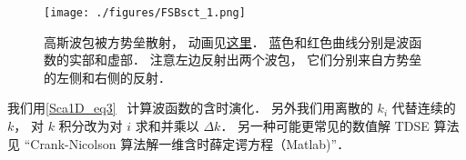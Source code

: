 
\begin{issues}
\issueDraft
\end{issues}


\begin{figure}[ht]
\centering
\texttt{[image: ./figures/FSBsct\_1.png]}
\caption{高斯波包被方势垒散射， 动画见\href{https://wuli.wiki/apps/FSBsct.html}{这里}． 蓝色和红色曲线分别是波函数的实部和虚部． 注意左边反射出两个波包， 它们分别来自方势垒的左侧和右侧的反射．} \label{FSBsct_fig1}
\end{figure}

我们用\autoref{Sca1D_eq3}~ 计算波函数的含时演化． 另外我们用离散的 $k_i$ 代替连续的 $k$， 对 $k$ 积分改为对 $i$ 求和并乘以 $\Delta{k}$． 另一种可能更常见的数值解 TDSE 算法见 “Crank-Nicolson 算法解一维含时薛定谔方程（Matlab)”．

